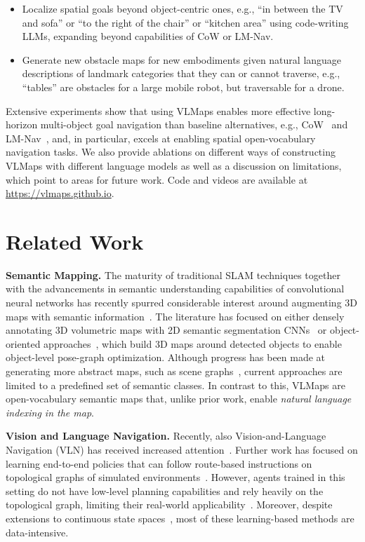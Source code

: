 \documentclass[letterpaper, 10 pt, conference]{ieeeconf}  %
\newcommand{\eg}{e.g., }
\begin{document}
\begin{itemize}[leftmargin=*]
  \item Localize spatial goals beyond object-centric ones, \eg ``in between the TV and sofa'' or ``to the right of the chair'' or ``kitchen area'' using code-writing LLMs, expanding beyond capabilities of CoW or LM-Nav.
  \item Generate new obstacle maps for new embodiments given natural language descriptions of landmark categories that they can or cannot traverse, \eg ``tables'' are obstacles for a large mobile robot, but traversable for a drone.
\end{itemize}

\noindent Extensive experiments show that using VLMaps enables more effective long-horizon multi-object goal navigation than baseline alternatives, \eg CoW~\cite{gadre2022clip} and LM-Nav~\cite{shah2022lm}, and, in particular, excels at enabling spatial open-vocabulary navigation tasks. We also provide ablations on different ways of constructing VLMaps with different language models as well as a discussion on limitations, which point to areas for future work. Code and videos are available at \href{https://vlmaps.github.io}{https://vlmaps.github.io}.

\section{Related Work}
\textbf{Semantic Mapping.}
The maturity of traditional SLAM techniques together with the advancements in semantic understanding capabilities of convolutional neural networks has recently spurred
considerable interest around augmenting 3D maps with semantic information~\cite{salas2013slam++, mccormac2017semanticfusion}. The literature has focused on either densely annotating 3D volumetric maps with 2D semantic segmentation CNNs~\cite{mccormac2017semanticfusion} or object-oriented approaches~\cite{runz2018maskfusion, mccormac2018fusion++, xu2019mid}, which build 3D maps around detected objects to enable object-level pose-graph optimization. Although progress has been made at generating more abstract maps, such as scene graphs~\cite{hughes2022hydra, wu2021scenegraphfusion}, current approaches are limited to a predefined set of semantic classes. In contrast to this, VLMaps are open-vocabulary semantic maps that, unlike prior work, enable \emph{natural language indexing in the map}.

\textbf{Vision and Language Navigation.} Recently, also Vision-and-Language Navigation (VLN) has received increased attention~\cite{anderson2018vision, krantz2020beyond}. Further work has focused on learning end-to-end policies that can follow route-based instructions on topological graphs of simulated environments~\cite{anderson2018vision, fried2018speaker, guhur2021airbert}. However, agents trained in this setting do not have low-level planning capabilities and rely heavily on the topological graph, limiting their real-world applicability~\cite{anderson2021sim}. Moreover, despite extensions to continuous state spaces~\cite{krantz2020beyond, krantz2021waypoint, hong2022bridging}, most of these learning-based methods are data-intensive. 
\end{document}
